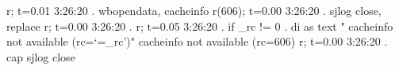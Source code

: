 r; t=0.01 3:26:20
.     wbopendata, cacheinfo
r(606); t=0.00 3:26:20
.     sjlog close, replace
r; t=0.00 3:26:20
. {\rbr}
r; t=0.05 3:26:20
{\smallskip}
. if _rc != 0 {\lbr}
.     di as text "  cacheinfo not available (rc=`=_rc')"
  cacheinfo not available (rc=606)
r; t=0.00 3:26:20
.     cap sjlog close
{\smallskip}
